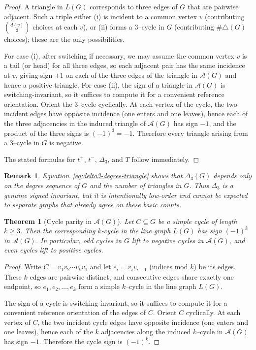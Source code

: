 \documentclass[11pt]{article}
\newtheorem{theorem}{Theorem}
\newtheorem{remark}{Remark}
\theoremstyle{plain}
\begin{document}
\begin{proof}
A triangle in $L(G)$ corresponds to three edges of $G$ that are pairwise adjacent.
Such a triple either (i) is incident to a common vertex $v$ (contributing
$\binom{d(v)}{3}$ choices at each $v$), or (ii) forms a $3$--cycle in $G$
(contributing $\#\triangle(G)$ choices); these are the only possibilities.

For case (i), after switching if necessary, we may assume the common vertex $v$
is a tail (or head) for all three edges, so each adjacent pair has the same
incidence at $v$, giving sign $+1$ on each of the three edges of the triangle in
$\mathcal A(G)$ and hence a positive triangle.
For case (ii), the sign of a triangle in $\mathcal A(G)$ is switching-invariant,
so it suffices to compute it for a convenient reference orientation.
Orient the $3$--cycle cyclically.
At each vertex of the cycle, the two incident edges have opposite incidence
(one enters and one leaves), hence each of the three adjacencies in the induced
triangle of $\mathcal A(G)$ has sign $-1$, and the product of the three signs is
$(-1)^3=-1$.  Therefore every triangle arising from a $3$--cycle in $G$ is negative.

The stated formulas for $t^+$, $t^-$, $\Delta_3$, and $T$ follow immediately.
\end{proof}

\begin{remark}\label{rem:delta3-limits}
Equation~\eqref{eq:delta3-degree-triangle} shows that $\Delta_3(G)$ depends only
on the degree sequence of $G$ and the number of triangles in $G$.  Thus $\Delta_3$
is a genuine signed invariant, but it is intentionally low-order and
cannot be expected to separate graphs that already agree on these basic counts.
\end{remark}

\begin{theorem}[Cycle parity in $\mathcal A(G)$]
\label{thm:cycle-parity}
Let $C \subseteq G$ be a simple cycle of length $k \ge 3$.
Then the corresponding $k$-cycle in the line graph $L(G)$
has sign $(-1)^k$ in $\mathcal A(G)$.
In particular, odd cycles in $G$ lift to negative cycles
in $\mathcal A(G)$, and even cycles lift to positive cycles.
\end{theorem}

\begin{proof}
Write $C=v_1v_2\cdots v_kv_1$ and let $e_i=v_iv_{i+1}$ (indices mod $k$) be its edges.
These $k$ edges are pairwise distinct, and consecutive edges share exactly one endpoint,
so $e_1,e_2,\dots,e_k$ form a simple $k$--cycle in the line graph $L(G)$.

The sign of a cycle is switching-invariant, so it suffices to compute it for a
convenient reference orientation of the edges of $C$.
Orient $C$ cyclically.  At each vertex of $C$, the two incident cycle edges have
opposite incidence (one enters and one leaves), hence each of the $k$ adjacencies
along the induced $k$--cycle in $\mathcal A(G)$ has sign $-1$.
Therefore the cycle sign is $(-1)^k$.
\end{proof}
\end{document}
